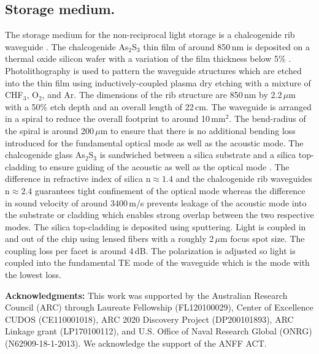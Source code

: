 \documentclass[superscriptaddress, nofootinbib, twocolumn, amsmath,amssymb, aps, pra, notitlepage, longbibliography]{revtex4-1}
\begin{document}
\subsection{Storage medium.}
The storage medium for the non-reciprocal light storage is a chalcogenide rib waveguide \cite{Madden2007,Pant2011}. The chalcogenide As\(_2\)S\(_3\) thin film of around 850\,nm is deposited on a thermal oxide silicon wafer with a variation of the film thickness below 5\% \cite{Zarifi2017}. Photolithography is used to pattern the waveguide structures which are etched into the thin film using inductively-coupled plasma dry etching with a mixture of CHF\(_3\), O\(_2\), and Ar. The dimensions of the rib structure are 850\,nm by 2.2\,\(\mu\)m with a 50\% etch depth and an overall length of 22\,cm. The waveguide is arranged in a spiral to reduce the overall footprint to around 10\,mm\(^2\). The bend-radius of the spiral is around 200\,\(\mu\)m to ensure that there is no additional bending loss introduced for the fundamental optical mode as well as the acoustic mode. \newline
The chalcogenide glass As\(_2\)S\(_3\) is sandwiched between a silica substrate and a silica top-cladding to ensure guiding of the acoustic as well as the optical mode \cite{Poulton2013a}. The difference in refractive index of silica \(\mathrm{n}\approx1.4\) and the chalcogenide rib waveguides \(\mathrm{n}\approx2.4\) guarantees tight confinement of the optical mode whereas the difference in sound velocity of around 3400\,m/s prevents leakage of the acoustic mode into the substrate or cladding which enables strong overlap between the two respective modes. The silica top-cladding is deposited using sputtering. \newline 
Light is coupled in and out of the chip using lensed fibers with a roughly 2\,\(\mu\)m focus spot size. The coupling loss per facet is around 4\,dB. The polarization is adjusted so light is coupled into the fundamental TE mode of the waveguide which is the mode with the lowest loss. \newline

%
\textbf{Acknowledgments:} This work was supported by the Australian Research Council (ARC) through Laureate Fellowship (FL120100029), Center of Excellence CUDOS (CE110001018), ARC 2020 Discovery Project (DP200101893), ARC Linkage grant (LP170100112), and U.S. Office of Naval Research Global (ONRG) (N62909-18-1-2013). We acknowledge the support of the ANFF ACT.
%

%
%
\end{document}
